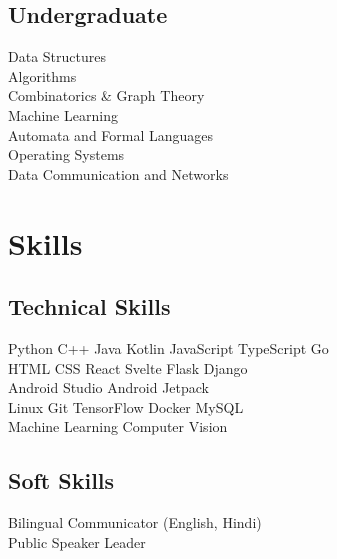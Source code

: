 \documentclass[]{deedy-resume-openfont}
\begin{document}
\begin{minipage}[t]{0.30\textwidth}
\subsection{Undergraduate}
Data Structures \\
Algorithms \\
Combinatorics \& Graph Theory \\
Machine Learning \\
Automata and Formal Languages \\
Operating Systems \\
Data Communication and Networks \\

\section{Skills}
\subsection{Technical Skills}
Python \textbullet{} C++ \textbullet{} Java \textbullet{} Kotlin \textbullet{} JavaScript \textbullet{} TypeScript \textbullet{} Go \\
\vspace{2mm}
HTML \textbullet{} CSS \textbullet{} React \textbullet{} Svelte \textbullet{} Flask \textbullet{} Django \\
\vspace{2mm}
Android Studio \textbullet{} Android Jetpack \\
\vspace{2mm}
Linux \textbullet{} Git \textbullet{} TensorFlow \textbullet{} Docker \textbullet{} MySQL \\
\vspace{2mm}
Machine Learning \textbullet{} Computer Vision
\sectionsep

\subsection{Soft Skills}
Bilingual Communicator (English, Hindi) \\
Public Speaker \textbullet{} Leader

\end{minipage}
\hfill
\end{document}
